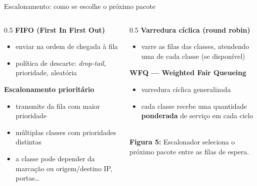 \documentclass[aspectratio=169,11pt]{beamer}
\begin{document}
\begin{frame}{Escalonamento: como se escolhe o próximo pacote}
  \begin{columns}
    \begin{column}{0.5\textwidth}
      \textbf{FIFO (First In First Out)}
      \begin{itemize}
        \item enviar na ordem de chegada à fila
        \item política de descarte: \emph{drop-tail}, prioridade, aleatória
      \end{itemize}
      \textbf{Escalonamento prioritário}
      \begin{itemize}
        \item transmite da fila com maior prioridade
        \item múltiplas classes com prioridades distintas
        \item a classe pode depender da marcação ou origem/destino IP, portas\ldots
      \end{itemize}
    \end{column}
    \begin{column}{0.5\textwidth}
      \textbf{Varredura cíclica (round robin)}
      \begin{itemize}
        \item varre as filas das classes, atendendo uma de cada classe (se disponível)
      \end{itemize}
      \textbf{WFQ --- Weighted Fair Queueing}
      \begin{itemize}
        \item varredura cíclica generalizada
        \item cada classe recebe uma quantidade \textbf{ponderada} de serviço em cada ciclo
      \end{itemize}
      \begin{center}
        \\[1mm]
        {\scriptsize \textbf{Figura 5:} Escalonador seleciona o próximo pacote entre as filas de espera.}
      \end{center}
    \end{column}
  \end{columns}
\end{frame}
\end{document}
